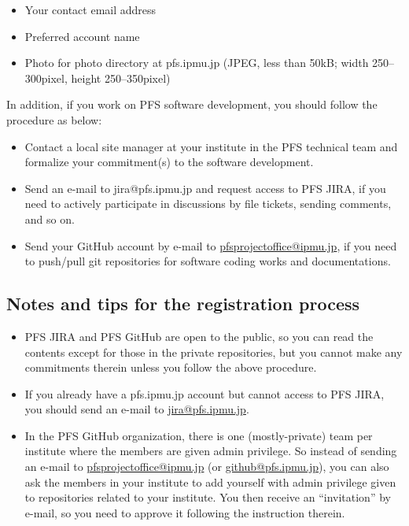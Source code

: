 \documentclass[a4paper,notitlepage]{article}
\begin{document}
\begin{itemize}
\item Your contact email address
\item Preferred account name
\item Photo for photo directory at pfs.ipmu.jp (JPEG, less than 50kB;
  width 250--300pixel, height 250--350pixel)
\end{itemize}
  
In addition, if you work on PFS software development, you should
follow the procedure as below:

\begin{itemize}
\item Contact a local site manager at your institute in the PFS
  technical team and formalize your commitment(s) to the software
  development.
\item Send an e-mail to jira@pfs.ipmu.jp and request access to PFS
  JIRA, if you need to actively participate in discussions by file
  tickets, sending comments, and so on.
\item Send your GitHub account by e-mail to
  \url{pfsprojectoffice@ipmu.jp}, if you need to push/pull git
  repositories for software coding works and documentations.
\end{itemize}

\subsection{Notes and tips for the registration process}

\begin{itemize}
\item PFS JIRA and PFS GitHub are open to the public, so you can read
  the contents except for those in the private repositories, but you
  cannot make any commitments therein unless you follow the above
  procedure.
\item If you already have a pfs.ipmu.jp account but cannot access to
  PFS JIRA, you should send an e-mail to \url{jira@pfs.ipmu.jp}.
\item In the PFS GitHub organization, there is one (mostly-private)
  team per institute where the members are given admin privilege. So
  instead of sending an e-mail to \url{pfsprojectoffice@ipmu.jp} (or
  \url{github@pfs.ipmu.jp}), you can also ask the members in your
  institute to add yourself with admin privilege given to repositories
  related to your institute. You then receive an ``invitation'' by
  e-mail, so you need to approve it following the instruction therein.
\end{itemize}
\end{document}
